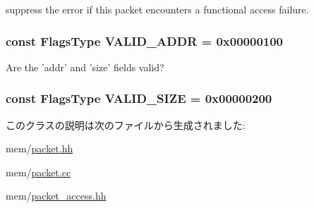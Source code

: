 \label{classPacket_a5e3b50f943fac776d71dbe3ff03cc7a5}
suppress the error if this packet encounters a functional access failure. \hypertarget{classPacket_ac99ea8fdca503270882373e7a801a2b6}{
\subsubsection[{VALID\_\-ADDR}]{\setlength{\rightskip}{0pt plus 5cm}const {\bf FlagsType} {\bf VALID\_\-ADDR} = 0x00000100}}
\label{classPacket_ac99ea8fdca503270882373e7a801a2b6}


Are the 'addr' and 'size' fields valid? \hypertarget{classPacket_a3e2067968b47a2acb352b48bced164cf}{
\subsubsection[{VALID\_\-SIZE}]{\setlength{\rightskip}{0pt plus 5cm}const {\bf FlagsType} {\bf VALID\_\-SIZE} = 0x00000200}}
\label{classPacket_a3e2067968b47a2acb352b48bced164cf}


このクラスの説明は次のファイルから生成されました:\begin{DoxyCompactItemize}
\item 
mem/\hyperlink{packet_8hh}{packet.hh}\item 
mem/\hyperlink{packet_8cc}{packet.cc}\item 
mem/\hyperlink{packet__access_8hh}{packet\_\-access.hh}\end{DoxyCompactItemize}
